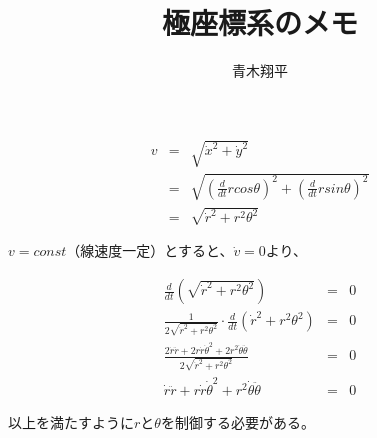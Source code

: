 \documentclass{article}
\title{極座標系のメモ}
\author{青木翔平}
\begin{document}
\maketitle

\begin{eqnarray}
v &=& \sqrt{\dot{x}^2 + \dot{y}^2} \nonumber \\
  &=& \sqrt{ \left(\frac{d}{dt} r cos\theta \right) ^2 + \left(\frac{d}{dt}r sin\theta\right) ^2} \nonumber \\
  &=& \sqrt{ \dot{r}^2+ r^2 \theta^2 } 
\end{eqnarray}	
	
$v=const$（線速度一定）とすると、$\dot{v} = 0$より、
	
\begin{eqnarray}
	\frac{d}{dt} \left(\sqrt{ \dot{r}^2+ r^2 \theta^2 } \right) &=& 0 \nonumber \\
\frac{1}{2\sqrt{ \dot{r}^2+ r^2 \theta^2 }} \cdot \frac{d}{dt}\left( \dot{r}^2+r^2 \theta^2 \right) &=& 0 \nonumber \\ 
\frac{2\dot{r}\ddot{r} + 2r\dot{r}\dot{\theta}^2 + 2r^2\dot{\theta}\ddot{\theta}}{2\sqrt{ \dot{r}^2+ r^2 \theta^2 }} &=& 0 \nonumber \\
\dot{r}\ddot{r} + r\dot{r}\dot{\theta}^2 + r^2\dot{\theta}\ddot{\theta} &=& 0  
\end{eqnarray}
	
以上を満たすように$r$と$\theta$を制御する必要がある。
	
	
	
\end{document}

